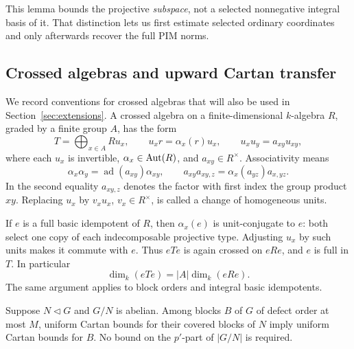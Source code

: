 This lemma bounds the projective \emph{subspace}, not a selected
nonnegative integral basis of it.  That distinction lets us first
estimate selected ordinary coordinates and only afterwards recover
the full PIM norms.

\subsection{Crossed algebras and upward Cartan transfer}

We record conventions for crossed algebras that will also be used in
Section~\ref{sec:extensions}.  A crossed algebra on a finite-dimensional
\(k\)-algebra \(R\), graded by a finite group \(A\), has the form
\[
 T=\bigoplus_{x\in A}Ru_x,\qquad
 u_xr=\alpha_x(r)u_x,\qquad u_xu_y=a_{xy}u_{xy},
\]
where each \(u_x\) is invertible, \(\alpha_x\in\operatorname{Aut}(R)\),
and \(a_{xy}\in R^\times\).  Associativity means
\[
 \alpha_x\alpha_y=\operatorname{ad}(a_{xy})\alpha_{xy},\qquad
 a_{xy}a_{xy,z}=\alpha_x(a_{yz})a_{x,yz}.
\]
In the second equality \(a_{xy,z}\) denotes the factor with first
index the group product \(xy\).  Replacing \(u_x\) by \(v_xu_x\),
\(v_x\in R^\times\), is called a change of homogeneous units.

If \(e\) is a full basic idempotent of \(R\), then
\(\alpha_x(e)\) is unit-conjugate to \(e\): both select one copy of
each indecomposable projective type.  Adjusting \(u_x\) by such units
makes it commute with \(e\).  Thus \(eTe\) is again crossed on \(eRe\),
and \(e\) is full in \(T\).  In particular
\[
 \dim_k(eTe)=|A|\dim_k(eRe).
\]
The same argument applies to block orders and integral basic
idempotents.

\begin{lemma}
\label{lem:abelian-transfer}
Suppose \(N\lhd G\) and \(G/N\) is abelian.  Among blocks \(B\) of
\(G\) of defect order at most \(M\), uniform Cartan bounds for their
covered blocks of \(N\) imply uniform Cartan bounds for \(B\).
No bound on the \(p'\)-part of \(|G/N|\) is required.
\end{lemma}

